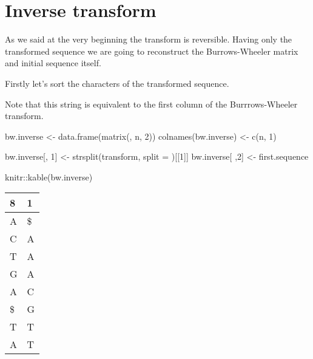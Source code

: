 \documentclass[
]{book}
\newenvironment{Shaded}{\begin{snugshade}}{\end{snugshade}}
\newcommand{\AttributeTok}[1]{\textcolor[rgb]{0.77,0.63,0.00}{#1}}
\newcommand{\CommentTok}[1]{\textcolor[rgb]{0.56,0.35,0.01}{\textit{#1}}}
\newcommand{\DecValTok}[1]{\textcolor[rgb]{0.00,0.00,0.81}{#1}}
\newcommand{\FunctionTok}[1]{\textcolor[rgb]{0.00,0.00,0.00}{#1}}
\newcommand{\NormalTok}[1]{#1}
\newcommand{\OtherTok}[1]{\textcolor[rgb]{0.56,0.35,0.01}{#1}}
\newcommand{\SpecialCharTok}[1]{\textcolor[rgb]{0.00,0.00,0.00}{#1}}
\newcommand{\StringTok}[1]{\textcolor[rgb]{0.31,0.60,0.02}{#1}}
\begin{document}
\hypertarget{inverse-transform}{%
\section{Inverse transform}\label{inverse-transform}}

As we said at the very beginning the transform is reversible. Having only the transformed sequence we are going to reconstruct the Burrows-Wheeler matrix and initial sequence itself.

Firstly let's sort the characters of the transformed sequence.

\begin{Shaded}
\end{Shaded}

Note that this string is equivalent to the first column of the Burrrows-Wheeler transform.

\begin{Shaded}
\begin{Highlighting}[]
\NormalTok{bw.inverse           }\OtherTok{\textless{}{-}} \FunctionTok{data.frame}\NormalTok{(}\FunctionTok{matrix}\NormalTok{(, n, }\DecValTok{2}\NormalTok{))}
\FunctionTok{colnames}\NormalTok{(bw.inverse) }\OtherTok{\textless{}{-}} \FunctionTok{c}\NormalTok{(n, }\DecValTok{1}\NormalTok{)}

\NormalTok{bw.inverse[, }\DecValTok{1}\NormalTok{] }\OtherTok{\textless{}{-}} \FunctionTok{strsplit}\NormalTok{(transform, }\AttributeTok{split =} \StringTok{\textquotesingle{}\textquotesingle{}}\NormalTok{)[[}\DecValTok{1}\NormalTok{]]}
\NormalTok{bw.inverse[ ,}\DecValTok{2}\NormalTok{] }\OtherTok{\textless{}{-}}\NormalTok{ first.sequence}

\NormalTok{knitr}\SpecialCharTok{::}\FunctionTok{kable}\NormalTok{(bw.inverse)}
\end{Highlighting}
\end{Shaded}

\begin{tabular}{l|l}
\hline
8 & 1\\
\hline
A & \$\\
\hline
C & A\\
\hline
T & A\\
\hline
G & A\\
\hline
A & C\\
\hline
\$ & G\\
\hline
T & T\\
\hline
A & T\\
\hline
\end{tabular}
\end{document}
